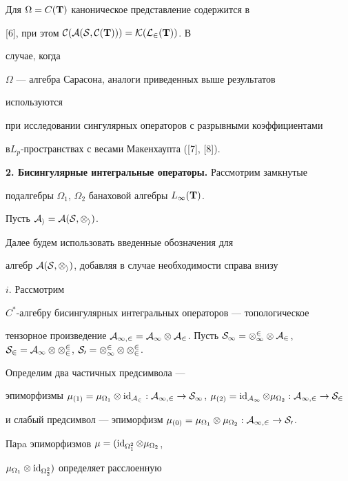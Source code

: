  


Для $\Omega=C(\bold T)$ каноническое представление содержится в 


[6], при этом $\cal C(\cal A(S,C(\bold T)))=\cal K(L_2(\bold T))$. В 


случае, когда 


$\Omega$ --- алгебра Сарасона, аналоги приведенных выше результатов 


используются 


при исследовании сингулярных операторов с разрывными коэффициентами 


в\linebreak $L_p$-пространствах с весами Макенхаупта ([7], [8]). 


\medskip 


 


{\bf 2. Бисингулярные интегральные операторы.} Рассмотрим замкнутые 


подалгебры $\Omega_1$, $\Omega_2$ банаховой алгебры $L_\infty(\bold T)$. 


Пусть $\cal A_i=\cal A(S,\Omega_i)$. 


Далее будем использовать введенные обозначения для 


алгебр $\cal A(S,\Omega_i)$, добавляя в случае необходимости справа внизу 


$i$. Рассмотрим 


$C^*$-алгебру бисингулярных интегральных операторов --- топологическое 


тензорное произведение $\cal A_{1,2}=\cal A_1\otimes\cal A_2$. Пусть $\cal 


S_1=\Omega^2_1\otimes\cal A_2$, $\cal S_2=\cal A_1\otimes 


\Omega^2_2$, $\cal S_0=\Omega^2_1\otimes\Omega^2_2$. 


Определим два частичных предсимвола --- 


эпиморфизмы $\mu_{(1)}=\mu_{\Omega_1}\otimes\id_{\cal A_2}:\cal 


A_{1,2}\to\cal S_1$, $\mu_{(2)}=\id_{\cal A_1}\otimes\mu_{\Omega_2}:\cal 


A_{1,2}\to\cal S_2$ 


и слабый предсимвол --- эпиморфизм $\mu_{(0)}=\mu_{\Omega_1}\otimes 


\mu_{\Omega_2}:\cal A_{1,2}\to\cal S_0$. 


Паpa эпиморфизмов $\mu=(\operatorname{id}_{\Omega^2_1}\otimes \mu_{\Omega_2}$, 


$\mu_{\Omega_1}\otimes\operatorname{id}_{\Omega^2_2})$ определяет расслоенную 


